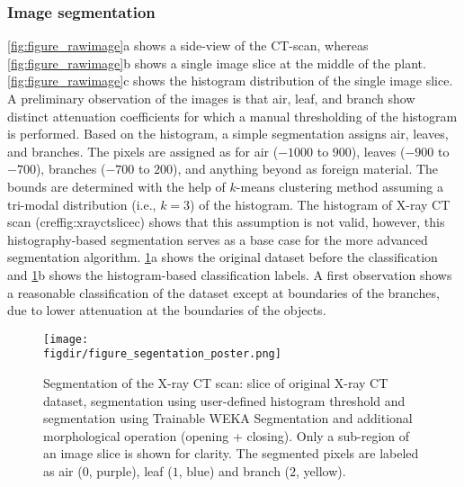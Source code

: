 \subsubsection*{Image segmentation}

\cref{fig:figure_rawimage}a shows a side-view of the CT-scan, whereas \cref{fig:figure_rawimage}b shows a single image slice at the middle of the plant. \cref{fig:figure_rawimage}c shows the histogram distribution of the single image slice. A preliminary observation of the images is that air, leaf, and branch show distinct attenuation coefficients for which a manual thresholding of the histogram is performed. Based on the histogram, a simple segmentation assigns air, leaves, and branches. The pixels are assigned as for air ($-1000$ to $900$), leaves ($-900$ to $-700$), branches ($-700$ to $200$), and anything beyond as foreign material. The bounds are determined with the help of $k$-means clustering method assuming a tri-modal distribution (i.e., $k=3$) of the histogram. The histogram of X-ray CT scan (cref{fig:xrayctslice}c) shows that this assumption is not valid, however, this histography-based segmentation serves as a base case for the more advanced segmentation algorithm. \cref{fig:xrayctslice}a shows the original dataset before the classification and \cref{fig:xrayctslice}b shows the histogram-based classification labels. A first observation shows a reasonable classification of the dataset except at boundaries of the branches, due to lower attenuation at the boundaries of the objects.

\begin{figure}[t]
	\centering
	\texttt{[image: \\figdir/figure\_segentation\_poster.png]}
	\caption{Segmentation of the X-ray CT scan:  slice of original X-ray CT dataset,  segmentation using user-defined histogram threshold and  segmentation using Trainable WEKA Segmentation and additional morphological operation (opening + closing). Only a sub-region of an image slice is shown for clarity. The segmented pixels are labeled as air ($0$, purple), leaf ($1$, blue) and branch ($2$, yellow).}
	\label{fig:xrayctslice}
\end{figure}

